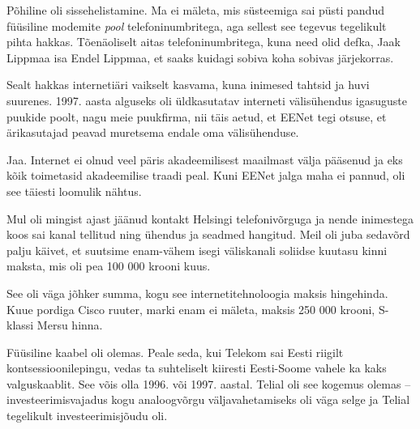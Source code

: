 
Põhiline oli sissehelistamine. Ma ei mäleta, mis süsteemiga sai 
püsti pandud füüsiline modemite \emph{pool} telefoninumbritega, aga sellest see 
tegevus tegelikult pihta hakkas. Tõenäoliselt aitas telefoninumbritega, kuna need 
olid defka, Jaak Lippmaa isa Endel 
Lippmaa, et saaks kuidagi sobiva 
koha sobivas järjekorras.

Sealt hakkas internetiäri vaikselt kasvama, kuna inimesed tahtsid ja huvi 
suurenes. 1997. aasta alguseks oli 
üldkasutatav interneti välisühendus igasuguste puukide poolt, nagu meie 
puukfirma, nii täis aetud, et EENet tegi otsuse, et
ärikasutajad peavad muretsema endale oma välisühenduse.


Jaa. Internet ei olnud veel päris akadeemilisest maailmast välja pääsenud ja 
eks kõik toimetasid akadeemilise traadi peal. Kuni EENet jalga 
maha ei pannud, oli see täiesti loomulik nähtus. 


Mul oli mingist ajast jäänud kontakt Helsingi telefonivõrguga ja nende 
inimestega koos sai kanal tellitud ning ühendus ja seadmed hangitud. Meil oli 
juba sedavõrd palju käivet, et suutsime enam-vähem isegi väliskanali soliidse
kuutasu kinni maksta, mis oli pea 100 000 krooni kuus. 


See oli väga jõhker summa, kogu see internetitehnoloogia maksis hingehinda. Kuue 
pordiga Cisco ruuter, marki enam ei mäleta, maksis 250 000 krooni, S-klassi Mersu hinna.


Füüsiline kaabel oli olemas. Peale seda, kui Telekom sai 
Eesti riigilt kontsessioonilepingu, vedas ta suhteliselt kiiresti Eesti-Soome 
vahele ka kaks valguskaablit. See võis olla 1996. või 1997. aastal. 
Telial oli see kogemus olemas -- investeerimisvajadus kogu
analoogvõrgu väljavahetamiseks oli väga selge ja Telial tegelikult 
investeerimisjõudu oli. 

